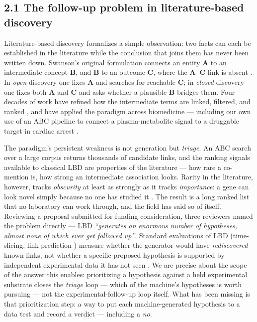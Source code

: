 \subsection*{2.1 The follow-up problem in literature-based discovery}\label{the-follow-up-problem-in-literature-based-discovery}

Literature-based discovery formalizes a simple observation: two facts can each be established in the
literature while the conclusion that joins them has never been written down. Swanson's original
formulation connects an entity \textbf{A} to an intermediate concept \textbf{B}, and \textbf{B} to an outcome \textbf{C},
where the \textbf{A--C} link is absent \cite{swanson1986}. In \emph{open} discovery one fixes \textbf{A} and searches for
reachable \textbf{C}; in \emph{closed} discovery one fixes both \textbf{A} and \textbf{C} and asks whether a plausible \textbf{B}
bridges them. Four decades of work have refined how the intermediate terms are linked, filtered, and
ranked \cite{henry2017,henry2019}, and have applied the paradigm across biomedicine --- including our own use of an ABC pipeline to
connect a plasma-metabolite signal to a druggable target in cardiac arrest \cite{henry2021}.

The paradigm's persistent weakness is not generation but \emph{triage}. An ABC search over a large corpus
returns thousands of candidate links, and the ranking signals available to classical LBD are properties
of the literature --- how rare a co-mention is, how strong an intermediate association looks. Rarity in the
literature, however, tracks \emph{obscurity} at least as strongly as it tracks \emph{importance}: a gene can look
novel simply because no one has studied it \cite{stoeger2018}. The result is a long ranked list that no laboratory can work
through, and the field has said so of itself. Reviewing a proposal submitted for funding consideration,
three reviewers named the problem directly --- LBD \emph{``generates an enormous number of hypotheses, almost none
of which ever get followed up''}. Standard evaluations of LBD (time-slicing, link prediction \cite{yetisgen2009,moreau2023}) measure
whether the generator would have \emph{rediscovered} known links, not whether a specific proposed hypothesis is
supported by independent experimental data it has not seen \cite{henry2021}. We are precise about the scope of the answer this enables: prioritizing a
hypothesis against a held experimental substrate closes the \emph{triage} loop --- which of the machine's
hypotheses is worth pursuing --- not the experimental-follow-up loop itself. What has been missing is that
prioritization step: a way to put each machine-generated hypothesis to a data test and record a verdict ---
including a \emph{no}.

